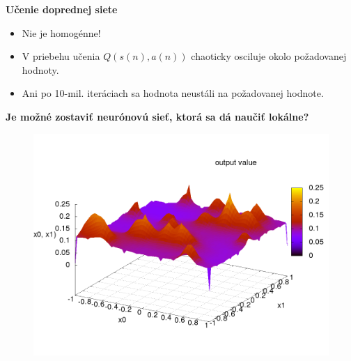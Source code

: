 \documentclass[xcolor=dvipsnames]{beamer}
\begin{document}
\begin{frame}{\bf Učenie doprednej siete}

\begin{itemize}
 \item Nie je homogénne! \\
 \item V priebehu učenia $Q(s(n),a(n))$ chaoticky osciluje okolo požadovanej hodnoty. \\
 \item Ani po 10-mil. iteráciach sa hodnota neustáli na požadovanej hodnote.
\end{itemize}

\end{frame}


\begin{frame}{\bf Je možné zostaviť neurónovú sieť, ktorá sa dá naučiť lokálne?}

\begin{figure}[!htb]
\includegraphics[scale=.35]{../pictures/gaussian.png}
\end{figure}

\end{frame}
\end{document}
